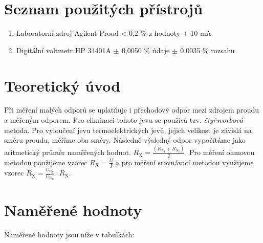 \documentclass[a4paper,12pt]{article}   %
\newcommand{\tsub}[1]{$_\textrm{#1}$}
\newcommand{\var}[2]{$#1_\text{#2}$}
\newcommand{\sub}[1]{_{\text{#1}}}
\newcommand{\rxi}{R\sub{X\tsub{1}}}
\newcommand{\rxii}{R\sub{X\tsub{2}}}
\newcommand{\rx}{R\sub{X}}
\newcommand{\rn}{R\sub{N}}
\newcommand{\urx}{U\sub{R\tsub{X}}}
\newcommand{\urn}{U\sub{R\tsub{N}}}
\begin{document}
\section{Seznam použitých přístrojů}
\label{chap:seznam_pristroju}
\begin{enumerate}
  \item Laboratorní zdroj Agilent Proud < 0,2 \% z hodnoty + 10 mA
  \item Digitální voltmetr HP 34401A \var{\pm}{} 0,0050 \% údaje \var{\pm}{} 0,0035 \% rozsahu
\end{enumerate}




\section{Teoretický úvod}
\label{chap:teoreticky_uvod}
Při měření malých odporů se uplatňuje i přechodový odpor mezi zdrojem proudu a měřeným odporem. Pro eliminaci tohoto jevu se používá tzv. \textit{čtyřsvorková} metoda. Pro vyloučení jevu termoelektrických jevů, jejich velikost je závislá na směru proudu, měříme oba směry. Následně výsledný odpor vypočítáme jako aritmetický průměr naměřených hodnot. $\rx=\frac{\left(\rxi+\rxii\right)}{2}$. Pro měření ohmovou metodou použijeme vzorec $\rx=\frac{U}{I}$ a pro měření srovnávací metodou využijeme vzorec $\rx = \frac{\urx}{\urn}\cdot\rn$.


\section{Naměřené hodnoty}
\label{chap:namerene_hodnoty}
Naměřené hodnoty jsou níže v tabulkách:
\end{document}
